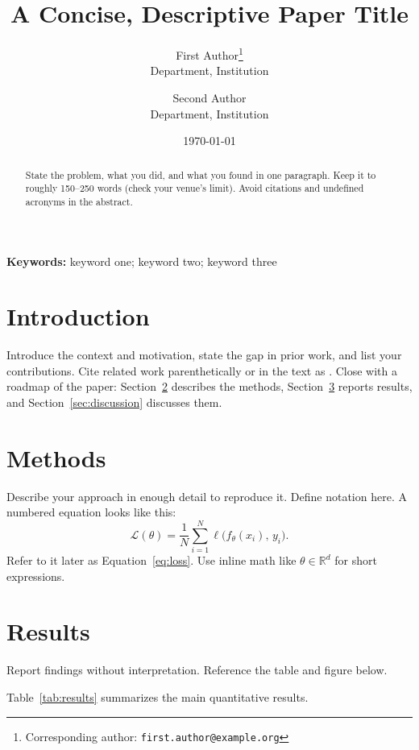 \documentclass[11pt]{article}
\title{A Concise, Descriptive Paper Title}
\author{%
  First Author\thanks{Corresponding author: \texttt{first.author@example.org}}\\
  \small Department, Institution\\
  \and
  Second Author\\
  \small Department, Institution%
}
\date{\today}
\begin{document}
\maketitle

\begin{abstract}
State the problem, what you did, and what you found in one paragraph.
Keep it to roughly 150--250 words (check your venue's limit).
Avoid citations and undefined acronyms in the abstract.
\end{abstract}

\noindent\textbf{Keywords:} keyword one; keyword two; keyword three

\section{Introduction}
\label{sec:intro}
Introduce the context and motivation, state the gap in prior work, and list
your contributions. Cite related work parenthetically \citep{smith2020example}
or in the text as \citet{jones2019book}. Close with a roadmap of the paper:
Section~\ref{sec:methods} describes the methods, Section~\ref{sec:results}
reports results, and Section~\ref{sec:discussion} discusses them.

\section{Methods}
\label{sec:methods}
Describe your approach in enough detail to reproduce it. Define notation here.
A numbered equation looks like this:
\begin{equation}
  \label{eq:loss}
  \mathcal{L}(\theta) = \frac{1}{N} \sum_{i=1}^{N} \ell\big(f_\theta(x_i),\, y_i\big).
\end{equation}
Refer to it later as Equation~\eqref{eq:loss}. Use inline math like
$\theta \in \mathbb{R}^d$ for short expressions.

\section{Results}
\label{sec:results}
Report findings without interpretation. Reference the table and figure below.

Table~\ref{tab:results} summarizes the main quantitative results.
\end{document}
